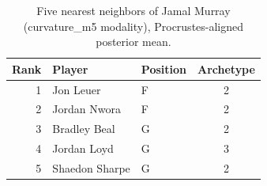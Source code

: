 \begin{table}[htbp]
  \centering\small
  \begin{tabular}{rllc}
    \toprule
    Rank & Player & Position & Archetype \\
    \midrule
    1 & Jon Leuer & F & 2 \\
    2 & Jordan Nwora & F & 2 \\
    3 & Bradley Beal & G & 2 \\
    4 & Jordan Loyd & G & 3 \\
    5 & Shaedon Sharpe & G & 2 \\
    \bottomrule
  \end{tabular}
  \caption{Five nearest neighbors of Jamal Murray (curvature_m5 modality), Procrustes-aligned posterior mean.}
  \label{tab:Jamal_Murray_neighbors_curvature_m5}
\end{table}

